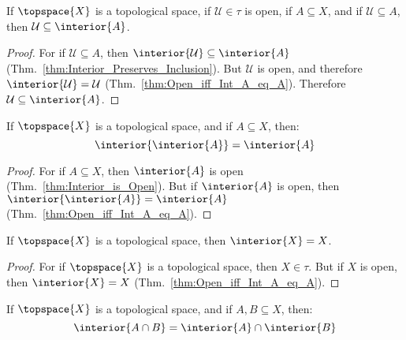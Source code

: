         \begin{theorem}
            \label{thm:Open_Subset_of_A_is_Subset_of_Interior}%
            If $\topspace{X}$ is a topological space, if
            $\mathcal{U}\in\tau$ is open, if $A\subseteq{X}$, and if
            $\mathcal{U}\subseteq{A}$, then
            $\mathcal{U}\subseteq\interior{A}$.
        \end{theorem}
        \begin{proof}
            For if $\mathcal{U}\subseteq{A}$, then
            $\interior{\mathcal{U}}\subseteq\interior{A}$
            (Thm.~\ref{thm:Interior_Preserves_Inclusion}). But $\mathcal{U}$
            is open, and therefore $\interior{\mathcal{U}}=\mathcal{U}$
            (Thm.~\ref{thm:Open_iff_Int_A_eq_A}). Therefore
            $\mathcal{U}\subseteq\interior{A}$.
        \end{proof}
        \begin{theorem}
            \label{thm:Idempotence_of_Interior}
            If $\topspace{X}$ is a topological space, and if
            $A\subseteq{X}$, then:
            \begin{equation}
                \interior{\interior{A}}=\interior{A}
            \end{equation}
        \end{theorem}
        \begin{proof}
            For if $A\subseteq{X}$, then $\interior{A}$ is open
            (Thm.~\ref{thm:Interior_is_Open}). But if $\interior{A}$ is
            open, then $\interior{\interior{A}}=\interior{A}$
            (Thm.~\ref{thm:Open_iff_Int_A_eq_A}).
        \end{proof}
        \begin{theorem}
            \label{thm:Interior_of_Whole_Space}%
            If $\topspace{X}$ is a topological space, then $\interior{X}=X$.
        \end{theorem}
        \begin{proof}
            For if $\topspace{X}$ is a topological space, then $X\in\tau$.
            But if $X$ is open, then $\interior{X}=X$
            (Thm.~\ref{thm:Open_iff_Int_A_eq_A}).
        \end{proof}
        \begin{theorem}
            \label{thm:Interior_Preserves_Intersection}%
            If $\topspace{X}$ is a topological space, and if
            $A,B\subseteq{X}$, then:
            \begin{equation}
                \interior{A\cap{B}}=\interior{A}\cap\interior{B}
            \end{equation}
        \end{theorem}
